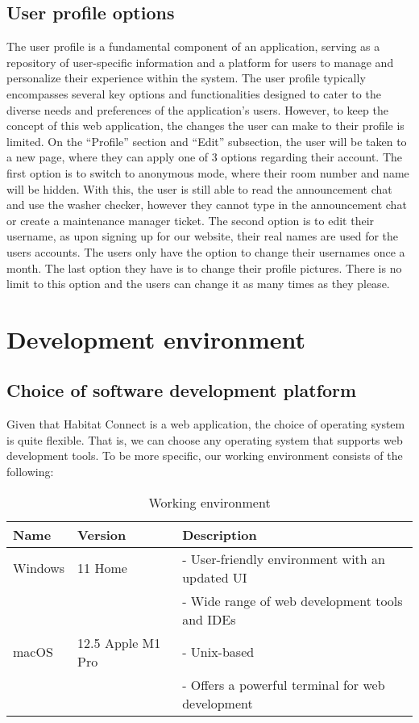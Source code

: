 \documentclass[conference]{IEEEtran}
\begin{document}
\subsection{User profile options}
The user profile is a fundamental component of an application, serving as a repository of user-specific information and a platform for users to manage and personalize their experience within the system. The user profile typically encompasses several key options and functionalities designed to cater to the diverse needs and preferences of the application's users. However, to keep the concept of this web application, the changes the user can make to their profile is limited. On the “Profile” section and “Edit” subsection, the user will be taken to a new page, where they can apply one of 3 options regarding their account. The first option is to switch to anonymous mode, where their room number and name will be hidden. With this, the user is still able to read the announcement chat and use the washer checker, however they cannot type in the announcement chat or create a maintenance manager ticket. The second option is to edit their username, as upon signing up for our website, their real names are used for the users accounts. The users only have the option to change their usernames once a month. The last option they have is to change their profile pictures. There is no limit to this option and the users can change it as many times as they please.


\section{Development environment}
\subsection{Choice of software development platform}
Given that Habitat Connect is a web application, the choice of operating system is quite flexible. That is, we can choose any operating system that supports web development tools. To be more specific, our working environment consists of the following:
\begin{table}[htbp]
\centering
\begin{tabular}{|p{1.6cm}|l|p{3.6cm}|}
\hline
\textbf{Name} & \textbf{Version} & \textbf{Description}\\
\hline
Windows & 11 Home & 
- User-friendly environment with an updated UI \\
& & 
- Wide range of web development tools and IDEs \\
\hline
macOS & 12.5 Apple M1 Pro & 
- Unix-based \\
& & 
- Offers a powerful terminal for web development \\


\hline
\end{tabular}
\caption{Working environment}
\label{tab2}
\end{table}
\end{document}
